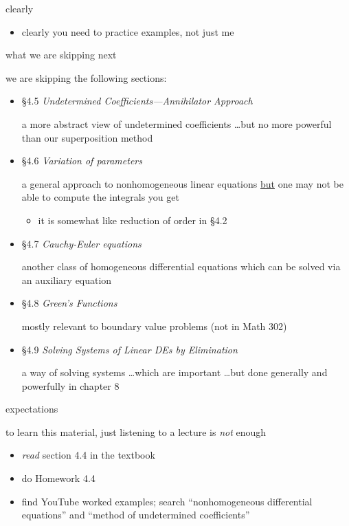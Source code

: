 \documentclass[dvipsnames]{beamer}
\begin{document}
\begin{frame}{clearly}

\begin{itemize}
\item clearly \alert{you} need to practice examples, not just me
\end{itemize}
\end{frame}


\begin{frame}{what we are skipping next}

we are \alert{skipping} the following sections:
\begin{itemize}
\item \S 4.5 \emph{Undetermined Coefficients---Annihilator Approach}

a more abstract view of undetermined coefficients \dots but no more powerful than our superposition method
\item \S 4.6 \emph{Variation of parameters}

a general approach to nonhomogeneous linear equations \underline{but} one may not be able to compute the integrals you get
    \begin{itemize}
    \item it is somewhat like reduction of order in \S 4.2
    \end{itemize}
\item \S 4.7 \emph{Cauchy-Euler equations}

another class of homogeneous differential equations which can be solved via an auxiliary equation
\item \S 4.8 \emph{Green's Functions}

mostly relevant to boundary value problems (not in Math 302)
\item \S 4.9 \emph{Solving Systems of Linear DEs by Elimination}

a way of solving systems \dots which are important \dots but done generally and powerfully in chapter 8
\end{itemize}
\end{frame}



\begin{frame}{expectations}

to learn this material, just listening to a lecture is \emph{not} enough
     \begin{itemize}
     \item \emph{read} section 4.4 in the textbook
     \item do Homework 4.4
     \item find YouTube worked examples; search ``nonhomogeneous differential equations'' and ``method of undetermined coefficients''
     \end{itemize}
\end{frame}
\end{document}
